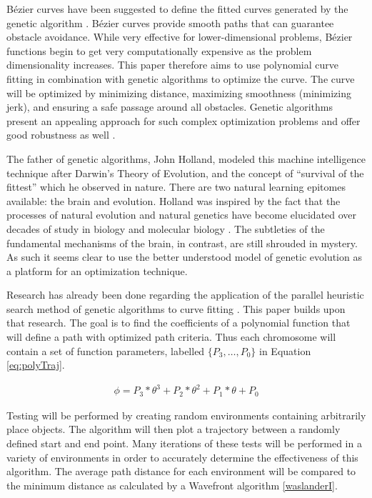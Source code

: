 B\'{e}zier curves have been suggested to define the fitted curves generated by the genetic algorithm \cite{choi10}. B\'{e}zier curves provide smooth paths that can guarantee obstacle avoidance. While very effective for lower-dimensional problems, B\'{e}zier functions begin to get very computationally expensive as the problem dimensionality increases. This paper therefore aims to use polynomial curve fitting in combination with genetic algorithms to optimize the curve. The curve will be optimized by minimizing distance, maximizing smoothness (minimizing jerk), and ensuring a safe passage around all obstacles. Genetic algorithms present an appealing approach for such complex optimization problems and offer good robustness as well \cite{zou12}.

The father of genetic algorithms, John Holland, modeled this machine intelligence technique after Darwin's Theory of Evolution, and the concept of ``survival of the fittest'' which he observed in nature. There are two natural learning epitomes available: the brain and evolution. Holland was inspired by the fact that the processes of natural evolution and natural genetics have become elucidated over decades of study in biology and molecular biology \cite{goldberg88}. The subtleties of the fundamental mechanisms of the brain, in contrast, are still shrouded in mystery. As such it seems clear to use the better understood model of genetic evolution as a platform for an optimization technique.

Research has already been done regarding the application of the parallel heuristic search method of genetic algorithms to curve fitting \cite{gulsen95,karr91,ismail08}. This paper builds upon that research. The goal is to find the coefficients of a polynomial function that will define a path with optimized path criteria. Thus each chromosome will contain a set of function parameters, labelled $\{P_3, \ldots, P_0\}$ in Equation \ref{eq:polyTraj}.

\begin{align} \label{eq:polyTraj}
	\phi = P_3*\theta^3 + P_2*\theta^2 + P_1*\theta + P_0
\end{align}

Testing will be performed by creating random environments containing arbitrarily place objects. The algorithm will then plot a trajectory between a randomly defined start and end point. Many iterations of these tests will be performed in a variety of environments in order to accurately determine the effectiveness of this algorithm. The average path distance for each environment will be compared to the minimum distance as calculated by a Wavefront algorithm \ref{waslanderI}.

